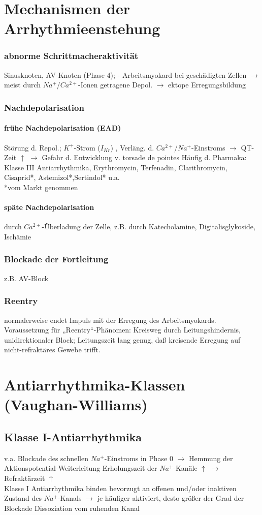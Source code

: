 \documentclass[10pt,a4paper]{report}
\begin{document}
\section{Mechanismen der Arrhythmieenstehung}
\subsubsection{abnorme Schrittmacheraktivität} Sinusknoten, AV-Knoten (Phase 4); - Arbeitsmyokard bei geschädigten Zellen $\rightarrow$ meist durch $Na^+$/$Ca^{2+}$-Ionen getragene Depol. $\rightarrow$ ektope Erregungsbildung
\subsubsection{Nachdepolarisation}
\paragraph{frühe Nachdepolarisation (EAD)} Störung d. Repol.; $K^+$-Strom ($I_{Kr}$) , Verläng. d. $Ca^{2+}$/$Na^+$-Einstroms $\rightarrow$ QT-Zeit $\uparrow$ $\rightarrow$ Gefahr d. Entwicklung v. torsade de pointes Häufig d. Pharmaka: Klasse III Antiarrhythmika, Erythromycin,	Terfenadin, Clarithromycin, Cisaprid*, Astemizol*,Sertindol* u.a.\\
*vom Markt genommen
\paragraph{späte Nachdepolarisation} durch $Ca^{2+}$-Überladung der Zelle, z.B. durch	Katecholamine, Digitalisglykoside, Ischämie
\subsubsection{Blockade der Fortleitung}z.B. AV-Block
\subsubsection{Reentry} normalerweise endet Impuls mit der Erregung des Arbeitsmyokards. Voraussetzung für „Reentry“-Phänomen: Kreisweg durch Leitungshindernis, unidirektionaler Block; Leitungszeit lang genug, daß kreisende Erregung auf nicht-refraktäres Gewebe trifft.
\section{Antiarrhythmika-Klassen (Vaughan-Williams)}
\subsection{Klasse I-Antiarrhythmika}
v.a. Blockade des schnellen $Na^+$-Einstroms in Phase 0 $\rightarrow$ Hemmung der Aktionspotential-Weiterleitung	Erholungszeit der $Na^+$-Kanäle $\uparrow$ $\rightarrow$ Refraktärzeit $\uparrow$ \\
Klasse I Antiarrhythmika binden bevorzugt an offenen und/oder inaktiven Zustand des $Na^+$-Kanals $\rightarrow$ je häufiger aktiviert, desto größer der Grad der Blockade Dissoziation vom ruhenden Kanal
\end{document}
